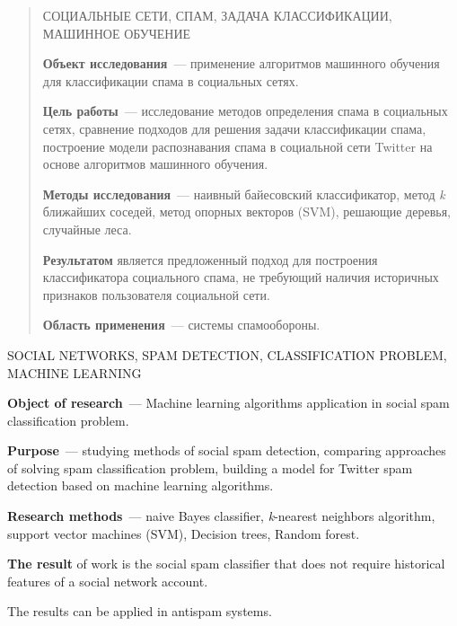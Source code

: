 
\clearpage
\begin{abstract}

СОЦИАЛЬНЫЕ СЕТИ, СПАМ, ЗАДАЧА КЛАССИФИКАЦИИ, МАШИННОЕ ОБУЧЕНИЕ

\textbf{Объект исследования}~--- применение алгоритмов машинного обучения для классификации спама в социальных сетях.

\textbf{Цель работы}~--- исследование методов определения спама в социальных сетях, сравнение подходов для решения задачи классификации спама, построение модели распознавания спама в социальной сети Twitter на основе алгоритмов машинного обучения.

\textbf{Методы исследования}~--- наивный байесовский классификатор, метод \textit{k} ближайших соседей, метод опорных векторов (SVM), решающие деревья, случайные леса.

\textbf{Результатом} является предложенный подход для построения классификатора социального спама, не требующий наличия историчных признаков пользователя социальной сети.

\textbf{Область применения}~--- системы спамообороны.
\end{abstract}


\pagebreak


\begin{abstract:en}

SOCIAL NETWORKS, SPAM DETECTION, CLASSIFICATION PROBLEM, MACHINE LEARNING

\textbf{Object of research}~--- Machine learning algorithms application in social spam classification problem.

\textbf{Purpose}~--- studying methods of social spam detection, comparing approaches of solving spam classification problem, building a model for Twitter spam detection based on machine learning algorithms.

\textbf{Research methods}~--- naive Bayes classifier, \textit{k}-nearest neighbors algorithm, support vector machines (SVM), Decision trees, Random forest.

\textbf{The result} of work is the social spam classifier that does not require historical features of a social network account.

The results can be applied in antispam systems.
\end{abstract:en}
